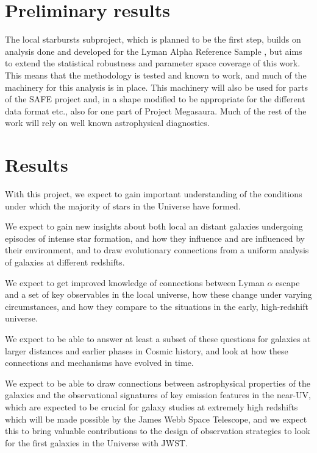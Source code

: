 \documentclass[12pt, a4paper]{scrartcl}
\begin{document}
\section{Preliminary results}

The local starbursts subproject, which is planned to be the first step, builds
on analysis done and developed for the Lyman Alpha Reference Sample
\citep{RiveraThorsen2015}, but aims to extend the statistical robustness and
parameter space coverage of this work. This means that the methodology is tested
and known to work, and much of the machinery for this analysis is in place. 
This machinery will also be used for parts of the SAFE project and, in a shape
modified to be appropriate for the different data format etc., also for one part
of Project Megasaura. Much of the rest of the work will rely on well known
astrophysical diagnostics.


\section{Results}

With this project, we expect to gain important understanding of the conditions
under which the majority of stars in the Universe have formed. 

We expect to gain new insights about both local an distant galaxies
undergoing episodes of intense star formation, and how they influence and are
influenced by their environment, and to draw evolutionary connections from a
uniform analysis of galaxies at different redshifts.

We expect to get improved knowledge of connections between Lyman $\alpha$ escape
and a set of key observables in the local universe, how these change under
varying circumstances, and how they compare to the situations in the early,
high-redshift universe.

We expect to be able to answer at least a subset of these questions for galaxies
at larger distances and earlier phases in Cosmic history, and look at how these
connections and mechanisms have evolved in time. 

We expect to be able to draw connections between astrophysical properties of the
galaxies and the observational signatures of key emission features in the
near-UV, which are expected to be crucial for galaxy studies at extremely high
redshifts which will be made possible by the James Webb Space Telescope, and we
expect this to bring valuable contributions to the design of observation
strategies to look for the first galaxies in the Universe with JWST.
\end{document}
